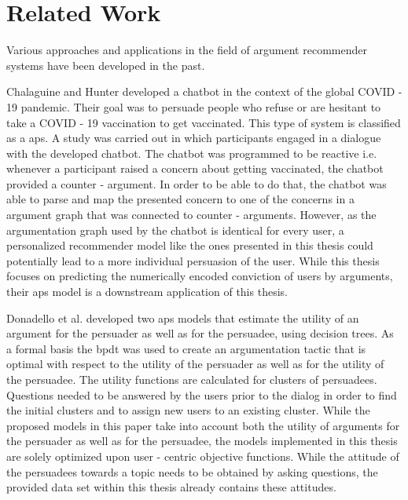 \section{Related Work}
Various approaches and applications in the field of argument recommender systems have been developed in the past.

Chalaguine and Hunter \cite{chalaguine2021addressing} developed a chatbot in the context of the global COVID - 19 pandemic. Their goal was to persuade people who refuse or are hesitant to take a COVID - 19 vaccination to get vaccinated. This type of system is classified as a \acrfull{aps}. A study was carried out in which participants engaged in a dialogue with the developed chatbot. The chatbot was programmed to be reactive i.e. whenever a participant raised a concern about getting vaccinated, the chatbot provided a counter - argument. In order to be able to do that, the chatbot was able to parse and map the presented concern to one of the concerns in a argument graph that was connected to counter - arguments. However, as the argumentation graph used by the chatbot is identical for every user, a personalized recommender model like the ones presented in this thesis could potentially lead to a more individual persuasion of the user. While this thesis focuses on predicting the numerically encoded conviction of users by arguments, their \acrshort{aps} model is a downstream application of this thesis.

Donadello et al. \cite{donadello2021machine} developed two \acrshort{aps} models that estimate the utility of an argument for the persuader as well as for the persuadee, using decision trees. As a formal basis the \acrfull{bpdt} \cite{hadoux2018biparty} was used to create an argumentation tactic that is optimal with respect to the utility of the persuader as well as for the utility of the persuadee. The utility functions are calculated for clusters of persuadees. Questions needed to be answered by the users prior to the dialog in order to find the initial clusters and to assign new users to an existing cluster. While the proposed models in this paper take into account both the utility of arguments for the persuader as well as for the persuadee, the models implemented in this thesis are solely optimized upon user - centric objective functions. While the attitude of the persuadees towards a topic needs to be obtained by asking questions, the provided data set within this thesis already contains these attitudes. 


